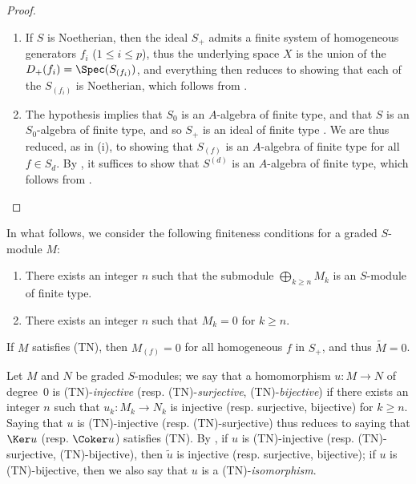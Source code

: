 \begin{proof}
\medskip\noindent
\begin{enumerate}
  \item[{\rm(i)}] If $S$ is Noetherian, then the ideal $S_+$ admits a finite system of homogeneous generators $f_i$ ($1\leq i\leq p$), thus  the underlying space $X$ is the union of the $D_+(f_i)=\Spec(S_{(f_i)})$, and everything then reduces to showing that each of the $S_{(f_i)}$ is Noetherian, which follows from .
  \item[{\rm(ii)}] The hypothesis implies that $S_0$ is an $A$-algebra of finite type, and that $S$ is an $S_0$-algebra of finite type, and so $S_+$ is an ideal of finite type .
    We are thus reduced, as in (i), to showing that $S_{(f)}$ is an $A$-algebra of finite type for all $f\in S_d$.
    By , it suffices to show that $S^{(d)}$ is an $A$-algebra of finite type, which follows from .
\end{enumerate}
\end{proof}

\begin{env}[2.7.2]
\label{II.2.7.2}
In what follows, we consider the following finiteness conditions for a graded $S$-module $M$:
\begin{enumerate}
  \item[{\rm(TF)}] There exists an integer $n$ such that the submodule $\bigoplus_{k\geq n}M_k$ is an $S$-module of finite type.
  \item[{\rm(TN)}] There exists an integer $n$ such that $M_k=0$ for $k\geq n$.
\end{enumerate}

If $M$ satisfies (TN), then $M_{(f)}=0$ for all homogeneous $f$ in $S_+$, and thus $\widetilde{M}=0$.

Let $M$ and $N$ be graded $S$-modules;
we say that a homomorphism $u: M\to N$ of degree~$0$ is (TN)-\emph{injective} (resp. (TN)-\emph{surjective}, (TN)-\emph{bijective}) if there exists an integer $n$ such that $u_k:M_k\to N_k$ is injective (resp. surjective, bijective) for $k\geq n$.
Saying that $u$ is (TN)-injective (resp. (TN)-surjective) thus reduces to saying that $\Ker u$ (resp. $\Coker u$) satisfies (TN).
By , if $u$ is (TN)-injective (resp. (TN)-surjective, (TN)-bijective), then $\widetilde{u}$ is injective (resp. surjective, bijective);
if $u$ is (TN)-bijective, then we also say that $u$ is a (TN)-\emph{isomorphism}.
\end{env}


